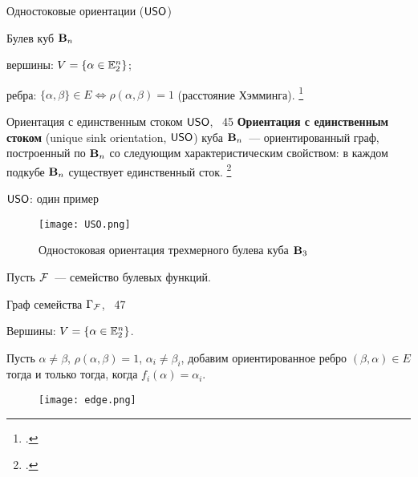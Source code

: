 \begin{frame}{Одностоковые ориентации ($\mathsf{USO}$)}
    \begin{myexample}{Булев куб  $\mathbf{B}_n$}
        \begin{coloritemize}
            \item вершины: $V = \{ \alpha \in \mathbb{E}_2^n \}$;
            \item ребра: $\{\alpha, \beta \} \in E \Leftrightarrow \rho(\alpha, \beta) = 1$ (расстояние Хэмминга).
            \footcitetext{yablonski}
        \end{coloritemize}
    \end{myexample}
    \begin{myexample}{Ориентация с единственным стоком $\mathsf{USO}$, ~45}
        \textbf{Ориентация с единственным стоком} (unique sink orientation, $\mathsf{USO}$) куба $\mathbf{B}_n$~--- ориентированный граф, построенный по $\mathbf{B}_n$ со следующим характеристическим свойством: в каждом подкубе $\mathbf{B}_n$ существует единственный сток.
        \footcitetext{szabo2001, USOphd}
    \end{myexample}
\end{frame}  

  
\begin{frame}{$\mathsf{USO}$: один пример}
    \begin{figure}
        \centering
        \texttt{[image: USO.png]}
        \caption{Одностоковая ориентация трехмерного булева куба $\mathbf{B}_3$}
    \end{figure}
\end{frame}


\begin{frame}%
    Пусть $\mathcal{F}$~--- семейство булевых функций.
    \begin{myexample}{Граф семейства $\Gamma_{\mathcal{F}}$, ~47}
        \begin{coloritemize}
            \item Вершины: $V = \{ \alpha \in \mathbb{E}_2^n \}$.
            \item Пусть $\alpha \ne \beta$, $\rho(\alpha, \beta) = 1$, $\alpha_i \ne \beta_i$, добавим ориентированное ребро $(\beta, \alpha) \in E$ тогда и только тогда, когда $f_i(\alpha) = \alpha_i$.
        \end{coloritemize}
    \end{myexample}
    \begin{figure}
        \centering
        \texttt{[image: edge.png]}
    \end{figure}
\end{frame}



